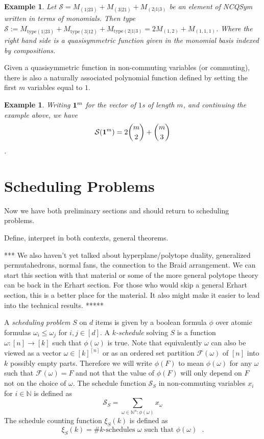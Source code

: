 \documentclass[12pt]{amsart}
\newtheorem{example}[definition]{Example}
\newcommand{\NN}{\mathbb{N}}
\newcommand{\SSS}{\mathcal{S}}
\newcommand{\FFF}{\mathcal{F}}
\newcommand{\defn}[1]{\emph{#1}}
\begin{document}
\begin{example}
Let $\mathcal{S} = M_{(1|23)} + M_{(3|21)} + M_{(2|1|3)}$ be an element of NCQSym written in terms of monomials.  Then 
{type} $\mathcal{S} :=  M_{\textrm{type} (1|23)} + M_{\textrm{type} (3|12)} + M_{\textrm{type} (2|1|3)} = 2 M_{(1,2)} + M_{(1,1,1)}$. Where the right hand side is a quasisymmetric function given in the monomial basis indexed by compositions.  
\end{example}



Given a quasisymmetric function in non-commuting variables (or
commuting), there is also a naturally associated polynomial function
defined by setting the first $m$ variables equal to $1$. 

\begin{example}
Writing ${\bf 1}^m$ for the vector of $1$s of length $m$, and continuing the example above, we have 
$$ \mathcal{S}({\bf 1}^m) = 2 {m \choose 2} + {m \choose 3}$$.  

\end{example}


\section{Scheduling Problems}

Now we have both preliminary sections and should return to scheduling problems.

Define, interpret in both contexts, general theorems.  

*** We also haven't yet talked about hyperplane/polytope duality, generalized permutahedrons, normal fans, the connection to the Braid arrangement.  We can start this section with that material or some of the more general polytope theory can be back in the Erhart section.  For those who would skip a general Erhart section, this is a better place for the material.  It also might make it easier to lead into the technical results.  *****




A \defn{scheduling problem} $S$ on $d$ items is given by a boolean formula $\phi$ over atomic formulas $\omega_i\leq \omega_j$ for $i,j\in[d]$.
 A \defn{$k$-schedule} solving $S$ is a function $\omega:[n]\rightarrow[k]$ such that $\phi(\omega)$ is true. Note that equivalently $\omega$ can also be viewed as a vector $\omega\in [k]^{[n]}$ or as an ordered set partition $\FFF(\omega)$ of $[n]$ into $k$ possibly empty parts. Therefore we will write $\phi(F)$ to mean $\phi(\omega)$ for any $\omega$ such that $\FFF(\omega)=F$ and not that the value of $\phi(F)$ will only depend on $F$ not on the choice of $\omega$. The schedule function $\SSS_S$ in non-commuting variables $x_i$ for $i\in \NN$ is defined as
\[
  \SSS_S = \sum_{\omega\in \NN^n: \phi(\omega) } x_\omega
\] 
The schedule counting function $\xi_S(k)$ is defined as
\[
  \xi_S(k) = \# \text{$k$-schedules $\omega$ such that $\phi(\omega)$ }.
\]
\end{document}
